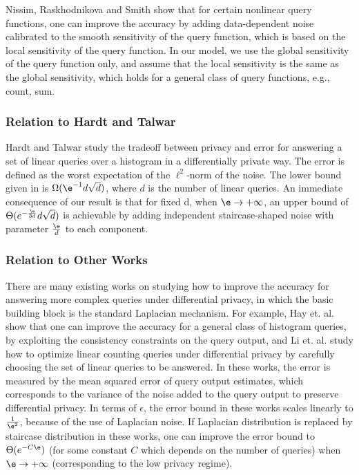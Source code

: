 Nissim, Raskhodnikova and Smith \cite{NRS07} show that for certain nonlinear query functions, one can improve the accuracy by adding data-dependent noise calibrated to the smooth sensitivity of the query function, which is based on the local sensitivity of the query function. In our model, we use   the global sensitivity of the query function only, and assume that the local sensitivity is the same as the global sensitivity, which holds for a general class of query functions, e.g., count, sum.





\subsubsection{Relation to Hardt and Talwar  \cite{geometry}  }


Hardt and Talwar \cite{geometry} study the tradeoff between privacy and error for answering a set of linear queries over a histogram in a differentially private way. The  error is defined as the worst  expectation of the $\ell^2$-norm of the noise. The lower bound given in \cite{geometry} is $\Omega( \e^{-1} d\sqrt{d})$, where $d$ is the number of linear queries. An immediate consequence of our result is that for fixed d, when $\e \to +\infty$, an upper bound of $\Theta(e^{-\frac{\e}{3d}}d \sqrt{d})$ is achievable by adding independent staircase-shaped noise with parameter $\frac{\e}{d}$ to each component.


\subsubsection{Relation to Other Works}

There are many existing works on studying how to improve the accuracy for answering more complex queries under differential privacy, in which the basic building block is the standard Laplacian mechanism. For example, Hay et. al. \cite{Hay10} show that  one can improve the accuracy for a general class of histogram queries, by exploiting the consistency constraints on the query output, and Li et. al. \cite{Li10}  study how to optimize linear counting queries under differential privacy by carefully choosing the set of linear queries to be answered. In these works, the error is measured by the mean squared error of query output estimates, which corresponds to the variance of the noise added to the query output to preserve differential privacy. In terms of $\epsilon$, the error bound in these works scales linearly to $\frac{1}{\e^2}$, because of the use of Laplacian noise. If Laplacian distribution is replaced by staircase distribution in these works, one can improve the error bound to $\Theta(e^{-C\e})$ (for some constant $C$ which depends on the number of queries) when $\e \to +\infty$ (corresponding to the low privacy regime).











